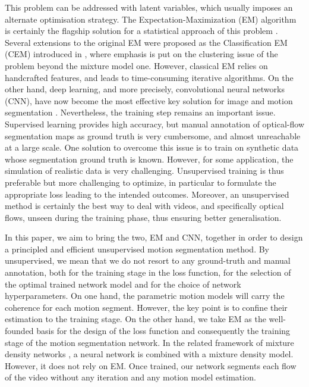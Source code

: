 \documentclass[10pt,twocolumn,letterpaper]{article}
\begin{document}
This problem can be addressed with latent variables, which usually imposes an alternate optimisation strategy. The Expectation-Maximization (EM) algorithm is certainly the flagship solution for a statistical approach of this problem \cite{dempster_EM_1977}. Several extensions to the original EM were proposed as the Classification EM (CEM) introduced in \cite{celeux1992}, where emphasis is put on the clustering issue of the problem beyond the mixture model one. However, classical EM relies on handcrafted features, and leads to time-consuming iterative algorithms. On the other hand, deep learning, and more precisely, convolutional neural networks (CNN), have now become the most effective key solution for image and motion segmentation \cite{badrinarayanan2017,He-mask-RCNN2017,ranjan_competitive_2019,ronneberger_Unet_2015}.
Nevertheless, the training step remains an important issue. Supervised learning provides high accuracy, but manual annotation of optical-flow segmentation maps as ground truth is very cumbersome, and almost unreachable at a large scale. {\color{black} One solution to overcome this issue is to train on synthetic data whose segmentation ground truth is known. However, for some application, the simulation of realistic data is very challenging.} Unsupervised training is thus preferable but 
{\color{black} more challenging to optimize, in particular to formulate the appropriate loss leading to the intended outcomes. Moreover,} an unsupervised method is certainly the best way to deal with videos, and specifically optical flows, unseen during the training phase, thus ensuring better generalisation.

In this paper, we aim to bring the two, EM and CNN, together in order to design a principled and efficient unsupervised motion segmentation method. 
By unsupervised, we mean that we do not resort to any ground-truth and manual annotation, both for the training stage in the loss function, for the selection of the optimal trained network model and for the choice of network hyperparameters.
On one hand, the parametric motion models will carry the coherence for each motion segment. However, the key point is to confine their estimation to the training stage. On the other hand, we take EM as the well-founded basis for the design of the loss function and consequently the training stage of the motion segmentation network. In the related framework of mixture density networks \cite{Bishop_MDN_1994}, a neural network is combined with a mixture density model. However, it does not rely on EM.
Once trained, our network segments each flow of the video without any iteration and any motion model estimation. 
\end{document}
